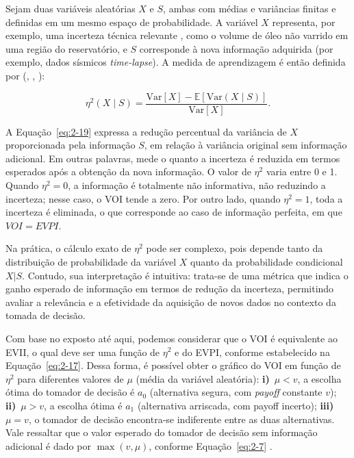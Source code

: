 Sejam duas variáveis aleatórias $X$ e $S$, ambas com médias e variâncias finitas e definidas em um mesmo espaço de probabilidade. A variável $X$ representa, por exemplo, uma incerteza técnica relevante , como o volume de óleo não varrido em uma região do reservatório, e $S$ corresponde à nova informação adquirida (por exemplo, dados sísmicos \textit{time-lapse}). A medida de aprendizagem é então definida por (\cite{06}, \cite{07}, \cite{08}):

\begin{equation}
\eta^{2}(X \mid S) = \frac{\text{Var}[X] - \mathbb{E}[\text{Var}(X \mid S)]}{\text{Var}[X]}.
\label{eq:2-19}
\end{equation}

A Equação~\eqref{eq:2-19} expressa a redução percentual da variância de $X$ proporcionada pela informação $S$, em relação à variância original sem informação adicional. Em outras palavras, mede o quanto a incerteza é reduzida em termos esperados após a obtenção da nova informação. O valor de $\eta^{2}$ varia entre 0 e 1. Quando $\eta^{2} = 0$, a informação é totalmente não informativa, não reduzindo a incerteza; nesse caso, o VOI tende a zero. Por outro lado, quando $\eta^{2} = 1$, toda a incerteza é eliminada, o que corresponde ao caso de informação perfeita, em que $VOI = EVPI$. 

Na prática, o cálculo exato de $\eta^{2}$ pode ser complexo, pois depende tanto da distribuição de probabilidade da variável $X$ quanto da probabilidade condicional $X|S$. Contudo, sua interpretação é intuitiva: trata-se de uma métrica que indica o ganho esperado de informação em termos de redução da incerteza, permitindo avaliar a relevância e a efetividade da aquisição de novos dados no contexto da tomada de decisão.

Com base no exposto até aqui, podemos considerar que o VOI é equivalente ao EVII, o qual deve ser uma função de $\eta^2$ e do EVPI, conforme estabelecido na Equação~\eqref{eq:2-17}. Dessa forma, é possível obter o gráfico do VOI em função de $\eta^2$ para diferentes valores de $\mu$ (média da variável aleatória): \textbf{i)}~$\mu < v$, a escolha ótima do tomador de decisão é $a_{0}$ (alternativa segura, com \textit{payoff} constante $v$); \textbf{ii)}~$\mu > v$, a escolha ótima é $a_{1}$ (alternativa arriscada, com payoff incerto); \textbf{iii)}~$\mu = v$, o tomador de decisão encontra-se indiferente entre as duas alternativas. Vale ressaltar que o valor esperado do tomador de decisão sem informação adicional é dado por $\max(v, \mu)$, conforme Equação~\eqref{eq:2-7} .

